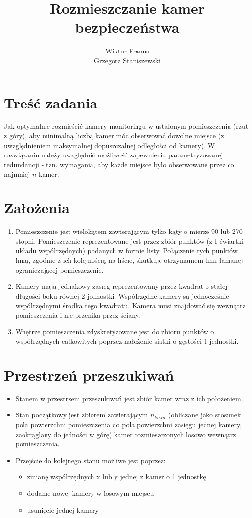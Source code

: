 \documentclass[12pt,a4paper]{article}
\title{Rozmieszczanie kamer bezpieczeństwa}
\author{Wiktor Franus \\ Grzegorz Staniszewski}
\begin{document}
\maketitle
\tableofcontents

\newpage
\section{Treść zadania}
Jak optymalnie rozmieścić kamery monitoringu w ustalonym pomieszczeniu (rzut z góry), aby minimalną liczbą kamer móc obserwować dowolne miejsce (z uwzględnieniem maksymalnej dopuszczalnej odległości od kamery). W rozwiązaniu należy uwzględnić możliwość zapewnienia parametryzowanej redundancji - tzn. wymagania, aby każde miejsce było obserwowane przez co najmniej $n$ kamer.

\section{Założenia}
\begin{enumerate}

\item Pomieszczenie jest wielokątem zawierającym tylko kąty o mierze 90 lub 270 stopni. Pomieszczenie reprezentowane jest przez zbiór punktów (z I ćwiartki układu współrzędnych) podanych w formie listy. Połączenie tych punktów linią, zgodnie z ich kolejnością na liście, skutkuje otrzymaniem linii łamanej ograniczającej pomieszczenie.
\item Kamery mają jednakowy zasięg reprezentowany przez kwadrat o stałej długości boku równej 2 jednostki. Współrzędne kamery są jednocześnie współrzędnymi środka tego kwadratu. Kamera musi znajdować się wewnątrz pomieszczenia i nie przenika przez ściany.
\item Wnętrze pomieszczenia zdyskretyzowane jest do zbioru punktów o współrzędnych całkowitych poprzez nałożenie siatki o gęstości 1 jednostki.
\end{enumerate}

\section{Przestrzeń przeszukiwań}
\begin{itemize}
	\item Stanem w przestrzeni przeszukiwań jest zbiór kamer wraz z ich położeniem.
	\item Stan początkowy jest zbiorem zawierającym $n_{kmin}$ (obliczane jako stosunek pola powierzchni pomieszczenia do pola powierzchni zasięgu jednej kamery, zaokrąglany do jedności w górę) kamer rozmieszczonych losowo wewnątrz pomieszczenia.
	\item Przejście do kolejnego stanu możliwe jest poprzez:
	\begin{itemize}
		\item zmianę współrzędnych x lub y jednej z kamer o 1 jednostkę
		\item dodanie nowej kamery w losowym miejscu
		\item usunięcie jednej kamery
	\end{itemize}
\end{itemize}
\end{document}
